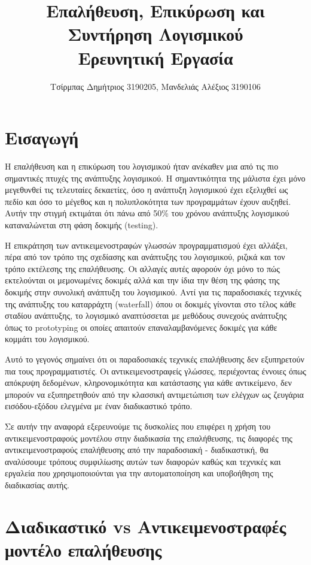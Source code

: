 \documentclass[12pt]{article}
\title{Επαλήθευση, Επικύρωση και Συντήρηση Λογισμικού \\\large Ερευνητική Εργασία}
\author{Τσίρμπας Δημήτριος 3190205, Μανδελιάς Αλέξιος 3190106}
\begin{document}
\maketitle

\section{Εισαγωγή}


Η επαλήθευση και η επικύρωση του λογισμικού ήταν ανέκαθεν μια από τις πιο σημαντικές πτυχές της ανάπτυξης λογισμικού. Η σημαντικότητα της μάλιστα έχει μόνο μεγεθυνθεί τις τελευταίες δεκαετίες, όσο η ανάπτυξη λογισμικού έχει εξελιχθεί ως πεδίο και όσο το μέγεθος και η πολυπλοκότητα των προγραμμάτων έχουν αυξηθεί. Αυτήν την στιγμή εκτιμάται ότι πάνω από 50\% του χρόνου ανάπτυξης λογισμικού καταναλώνεται στη φάση δοκιμής (testing).


\par Η επικράτηση των αντικειμενοστραφών γλωσσών προγραμματισμού έχει αλλάξει, πέρα από τον τρόπο της σχεδίασης και ανάπτυξης του λογισμικού, ριζικά και τον τρόπο εκτέλεσης της επαλήθευσης. Οι αλλαγές αυτές αφορούν όχι μόνο το πώς εκτελούνται οι μεμονωμένες δοκιμές αλλά και την ίδια την θέση της φάσης της δοκιμής στην συνολική ανάπτυξη του λογισμικού. Αντί για τις παραδοσιακές τεχνικές της ανάπτυξης του καταρράχτη (waterfall) όπου οι δοκιμές γίνονται στο τέλος κάθε σταδίου ανάπτυξης, το λογισμικό αναπτύσ\-σεται με μεθόδους συνεχούς ανάπτυξης όπως το prototyping οι οποίες απαιτούν επαναλαμβανόμενες δοκιμές για κάθε κομμάτι του λογισμικού.

\par Αυτό το γεγονός σημαίνει ότι οι παραδοσιακές τεχνικές επαλήθευσης δεν εξυπηρετούν πια τους προγραμματιστές. Οι αντικειμενοστραφείς γλώσσες, περιέχοντας έννοιες όπως απόκρυψη δεδομένων, κληρονομικότητα και κατάστασης για κάθε αντικείμενο, δεν μπορούν να εξυπηρετηθούν από την κλασσική 
αντιμετώπιση των ελέγχων ως ζευγάρια εισόδου-εξόδου ελεγμένα με έναν διαδικαστικό τρόπο. 

\par Σε αυτήν την αναφορά εξερευνούμε τις δυσκολίες που επιφέρει η χρήση του αντικειμενοστραφούς μοντέλου στην διαδικασία της επαλήθευσης, τις διαφορές της αντικειμενοστραφούς επαλήθευσης από την παραδοσιακή - διαδικαστική, θα αναλύσουμε τρόπους συμφιλίωσης αυτών των διαφορών καθώς και τεχνικές και εργαλεία που χρησιμοποιούνται για την αυτοματοποίηση και υποβοήθηση της διαδικασίας αυτής. 

\section{Διαδικαστικό vs Αντικειμενοστραφές μοντέλο επαλήθευσης}
\end{document}
